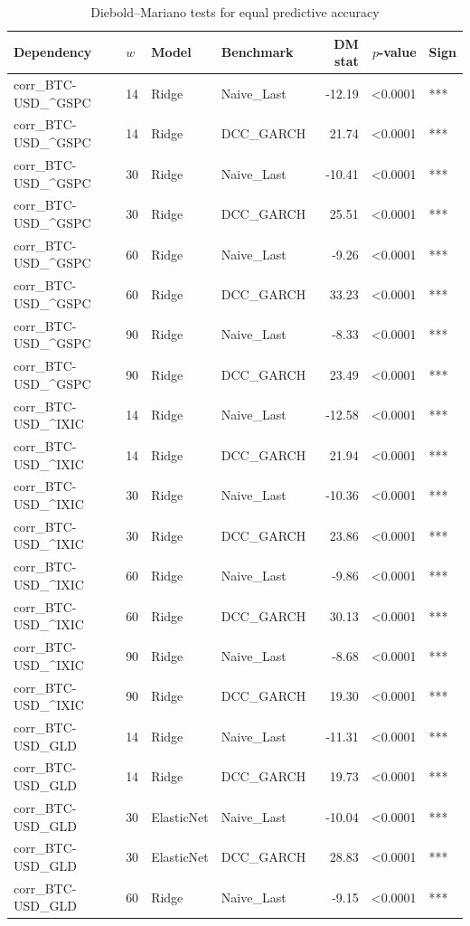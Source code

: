 \begin{table}[H]
\centering
\small
\caption{Diebold--Mariano tests for equal predictive accuracy}
\label{tab:dm_tests}
\begin{tabular}{llllrrl}
\toprule
Dependency & $w$ & Model & Benchmark & DM stat & $p$-value & Sign \\
\midrule
corr_BTC-USD_^GSPC & 14 & Ridge & Naive_Last & -12.19 & <0.0001 & *** \\
corr_BTC-USD_^GSPC & 14 & Ridge & DCC_GARCH & 21.74 & <0.0001 & *** \\
corr_BTC-USD_^GSPC & 30 & Ridge & Naive_Last & -10.41 & <0.0001 & *** \\
corr_BTC-USD_^GSPC & 30 & Ridge & DCC_GARCH & 25.51 & <0.0001 & *** \\
corr_BTC-USD_^GSPC & 60 & Ridge & Naive_Last & -9.26 & <0.0001 & *** \\
corr_BTC-USD_^GSPC & 60 & Ridge & DCC_GARCH & 33.23 & <0.0001 & *** \\
corr_BTC-USD_^GSPC & 90 & Ridge & Naive_Last & -8.33 & <0.0001 & *** \\
corr_BTC-USD_^GSPC & 90 & Ridge & DCC_GARCH & 23.49 & <0.0001 & *** \\
corr_BTC-USD_^IXIC & 14 & Ridge & Naive_Last & -12.58 & <0.0001 & *** \\
corr_BTC-USD_^IXIC & 14 & Ridge & DCC_GARCH & 21.94 & <0.0001 & *** \\
corr_BTC-USD_^IXIC & 30 & Ridge & Naive_Last & -10.36 & <0.0001 & *** \\
corr_BTC-USD_^IXIC & 30 & Ridge & DCC_GARCH & 23.86 & <0.0001 & *** \\
corr_BTC-USD_^IXIC & 60 & Ridge & Naive_Last & -9.86 & <0.0001 & *** \\
corr_BTC-USD_^IXIC & 60 & Ridge & DCC_GARCH & 30.13 & <0.0001 & *** \\
corr_BTC-USD_^IXIC & 90 & Ridge & Naive_Last & -8.68 & <0.0001 & *** \\
corr_BTC-USD_^IXIC & 90 & Ridge & DCC_GARCH & 19.30 & <0.0001 & *** \\
corr_BTC-USD_GLD & 14 & Ridge & Naive_Last & -11.31 & <0.0001 & *** \\
corr_BTC-USD_GLD & 14 & Ridge & DCC_GARCH & 19.73 & <0.0001 & *** \\
corr_BTC-USD_GLD & 30 & ElasticNet & Naive_Last & -10.04 & <0.0001 & *** \\
corr_BTC-USD_GLD & 30 & ElasticNet & DCC_GARCH & 28.83 & <0.0001 & *** \\
corr_BTC-USD_GLD & 60 & Ridge & Naive_Last & -9.15 & <0.0001 & *** \\

\end{tabular}
\end{table}
